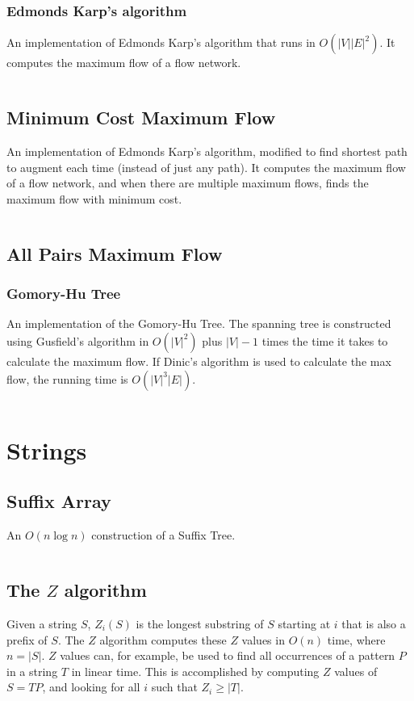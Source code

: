\documentclass[9pt,a4paper,twocolumn,landscape,oneside]{amsart}
\newcommand{\code}[1]{\inputminted{cpp}{_code/#1}}
\begin{document}
        \subsubsection{Edmonds Karp's algorithm}
            An implementation of Edmonds Karp's algorithm that runs in
            $O(|V||E|^2)$. It computes the maximum flow of a flow network.
            \code{graph/edmonds_karps.cpp}

    \subsection{Minimum Cost Maximum Flow}
        An implementation of Edmonds Karp's algorithm, modified to find
        shortest path to augment each time (instead of just any path). It
        computes the maximum flow of a flow network, and when there are
        multiple maximum flows, finds the maximum flow with minimum cost.
        \code{graph/edmonds_karps_mcmf.cpp}

    \subsection{All Pairs Maximum Flow}
        \subsubsection{Gomory-Hu Tree}
        An implementation of the Gomory-Hu Tree. The spanning tree is constructed using Gusfield's algorithm
        in $O(|V| ^ 2)$ plus $|V|-1$ times the time it takes to calculate the maximum flow.
        If Dinic's algorithm is used to calculate the max flow, the running time is $O(|V|^3|E|)$.
        \code{graph/gomory_hu_tree.cpp}

\section{Strings}
    \subsection{Suffix Array}
        An $O(n \log n)$ construction of a Suffix Tree.
        \code{strings/suffix_array.cpp}

    \subsection{The $Z$ algorithm}
        Given a string $S$, $Z_i(S)$ is the longest substring of $S$ starting
        at $i$ that is also a prefix of $S$. The $Z$ algorithm computes these
        $Z$ values in $O(n)$ time, where $n = |S|$. $Z$ values can, for
        example, be used to find all occurrences of a pattern $P$ in a string
        $T$ in linear time. This is accomplished by computing $Z$ values of $S
        = T P$, and looking for all $i$ such that $Z_i \geq |T|$.
        \code{strings/z_algorithm.cpp}
\end{document}
